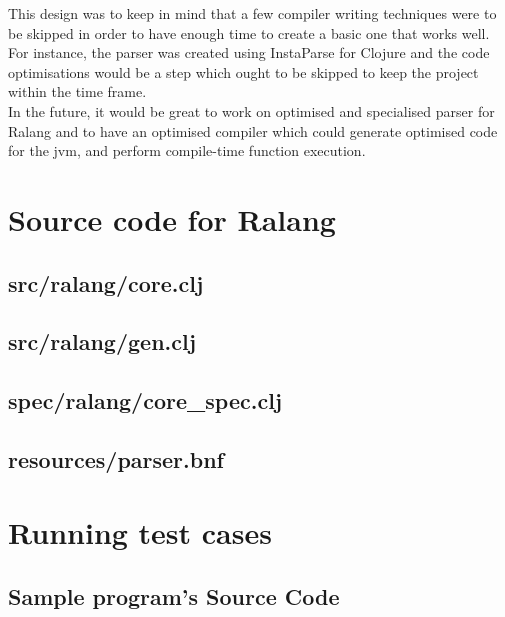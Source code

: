 \documentclass[a4paper]{article}
\begin{document}
	This design was to keep in mind that a few compiler writing techniques were to be skipped in order to have enough time to create a basic one that works well. For instance, the parser was created using InstaParse for Clojure and the code optimisations would be a step which ought to be skipped to keep the project within the time frame.\\
	
	In the future, it would be great to work on optimised and specialised parser for Ralang and to have an optimised compiler which could generate optimised code for the \ac{jvm}, and perform compile-time function execution.
	\newpage
	\printbibliography
	\newpage
	\appendixpage
	\label{App:Appendices}
	\begin{appendices}
	\section{Source code for Ralang}
	\label{App:SourceCode}
	\subsection{src/ralang/core.clj}
	
	\subsection{src/ralang/gen.clj}
	
	\subsection{spec/ralang/core\_spec.clj}
	
	\subsection{resources/parser.bnf}
	
	\pagebreak
	\section{Running test cases}
	\label{App:Running}
	\subsection{Sample program's Source Code}

\end{appendices}
\end{document}
